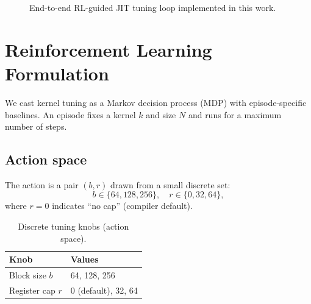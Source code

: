 \documentclass[journal,letterpaper]{IEEEtran}
\begin{document}
\begin{figure}[t]
\centering
{}
\caption{End-to-end RL-guided JIT tuning loop implemented in this work.}
\label{fig:system}
\end{figure}

\section{Reinforcement Learning Formulation}
\label{sec:rl}

We cast kernel tuning as a Markov decision process (MDP) with episode-specific baselines.
An episode fixes a kernel $k$ and size $N$ and runs for a maximum number of steps.

\subsection{Action space}
The action is a pair $(b, r)$ drawn from a small discrete set:
\begin{equation}
  b \in \{64, 128, 256\},\quad r \in \{0, 32, 64\},
\end{equation}
where $r{=}0$ indicates ``no cap'' (compiler default).

\begin{table}[t]
\centering
\caption{Discrete tuning knobs (action space).}
\label{tab:action_space}
\begin{tabular}{ll}
\toprule
Knob & Values \\
\midrule
Block size $b$ & 64, 128, 256 \\
Register cap $r$ & 0 (default), 32, 64 \\
\bottomrule
\end{tabular}
\end{table}
\end{document}
